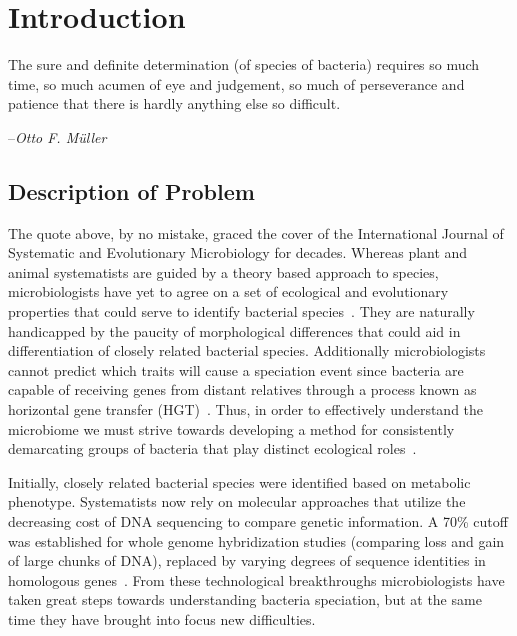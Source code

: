 \gobbletocpage
\chapter{Introduction}
\restoretocpage

\begin{shadequote}
The sure and definite determination (of species of bacteria) requires so much time, so much acumen of eye and judgement, so much of perseverance and patience that there is hardly anything else so \mbox{difficult}. \par--\emph{Otto F. M\"uller}
\end{shadequote}


\section{Description of Problem}
The quote above, by no mistake, graced the cover of the International Journal of Systematic and Evolutionary Microbiology for decades.
Whereas plant and animal systematists are guided by a theory based approach to  species, microbiologists have yet to agree on a set of ecological and evolutionary properties that could serve to identify bacterial species~\cite{cohan2007systematics}.
They are naturally handicapped by the paucity of morphological differences that could aid in differentiation of closely related bacterial species.
Additionally microbiologists cannot predict which traits will cause a speciation event since bacteria are capable of receiving genes from distant relatives through a process known as horizontal gene transfer (HGT)~\cite{cohan2007systematics}.
Thus, in order to effectively understand the microbiome we must strive towards developing a method for consistently demarcating groups of bacteria that play distinct ecological roles~\cite{koeppel2008identifying}.

Initially, closely related bacterial species were identified based on metabolic phenotype.
Systematists now rely on molecular approaches that utilize the decreasing cost of DNA sequencing to compare genetic information.
A 70\% cutoff was established for whole genome hybridization studies (comparing loss and gain of large chunks of DNA), replaced by varying degrees of sequence identities in homologous genes~\cite{cohan2007systematics,carlo,staley1997biodiversity}.
From these technological breakthroughs microbiologists have taken great steps towards understanding bacteria speciation, but at the same time they have brought into focus new difficulties.

